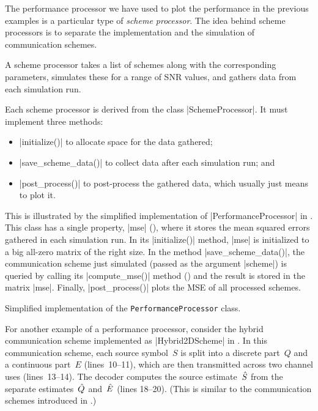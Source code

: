 The performance processor we have used to plot the performance in the previous
examples is a particular type of \emph{scheme processor}. The idea behind scheme
processors is to separate the implementation and the simulation of communication
schemes.

A scheme processor takes a list of schemes along with the corresponding
parameters, simulates these for a range of SNR values, and gathers data from
each simulation run. 

Each scheme processor is derived from the class |SchemeProcessor|. It must
implement three methods:
\begin{itemize}
  \item |initialize()| to allocate space for the data gathered;
  \item |save_scheme_data()| to collect data after each simulation run; and
  \item |post_process()| to post-process the gathered data, which usually just
    means to plot it.
\end{itemize}
This is illustrated by the simplified implementation of |PerformanceProcessor|
in . This class has a single property, |mse| (),
where it stores the mean squared errors gathered in each simulation run. In its
|initialize()| method, |mse| is initialized to a big all-zero matrix of the
right size. In the method |save_scheme_data()|, the communication scheme just
simulated (passed as the argument |scheme|) is queried by calling its
|compute_mse()| method () and the result is stored in the matrix
|mse|. Finally, |post_process()| plots the MSE of all processed schemes.

\begin{listing}
  \caption{Simplified implementation of the \texttt{PerformanceProcessor}
  class.}
  \label{lst:perfproc}
\end{listing}

For another example of a performance processor, consider the hybrid
communication scheme implemented as |Hybrid2DScheme| in .
In this communication scheme, each source symbol~$S$ is split into a discrete
part~$Q$ and a continuous part~$E$ (lines~10--11), which are then transmitted
across two
channel uses (lines~13--14).  The decoder computes the source estimate~${\hat{S}}$
from the separate estimates~$\hat{Q}$ and~$\hat{E}$ (lines 18--20). (This is similar to
the communication schemes introduced in .)

